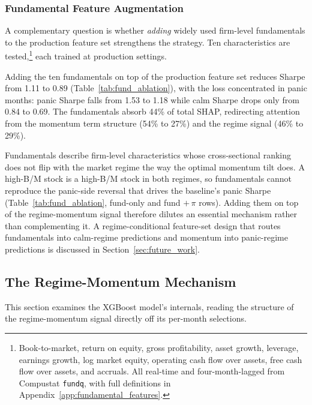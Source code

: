 


\subsubsection{Fundamental Feature Augmentation}\label{sec:fund_ablation}

A complementary question is whether \emph{adding} widely used firm-level fundamentals to the production feature set strengthens the strategy. Ten characteristics are tested,\footnote{Book-to-market, return on equity, gross profitability, asset growth, leverage, earnings growth, log market equity, operating cash flow over assets, free cash flow over assets, and accruals. All real-time and four-month-lagged from Compustat \texttt{fundq}, with full definitions in Appendix~\ref{app:fundamental_features}.} each trained at production settings.



Adding the ten fundamentals on top of the production feature set reduces Sharpe from 1.11 to 0.89 (Table~\ref{tab:fund_ablation}), with the loss concentrated in panic months: panic Sharpe falls from 1.53 to 1.18 while calm Sharpe drops only from 0.84 to 0.69. The fundamentals absorb 44\% of total SHAP, redirecting attention from the momentum term structure (54\% to 27\%) and the regime signal (46\% to 29\%).

Fundamentals describe firm-level characteristics whose cross-sectional ranking does not flip with the market regime the way the optimal momentum tilt does. A high-B/M stock is a high-B/M stock in both regimes, so fundamentals cannot reproduce the panic-side reversal that drives the baseline's panic Sharpe (Table~\ref{tab:fund_ablation}, fund-only and fund $+\,\pi$ rows). Adding them on top of the regime-momentum signal therefore dilutes an essential mechanism rather than complementing it. A regime-conditional feature-set design that routes fundamentals into calm-regime predictions and momentum into panic-regime predictions is discussed in Section~\ref{sec:future_work}.


\subsection{The Regime-Momentum Mechanism}\label{sec:regime_results}

This section examines the XGBoost model's internals, reading the structure of the regime-momentum signal directly off its per-month selections.

